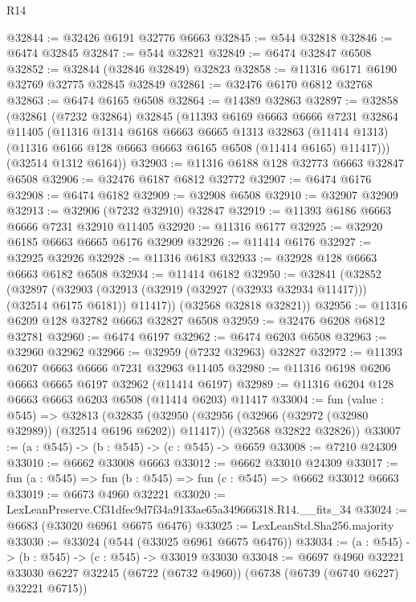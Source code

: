 \begin{lexlean}{R14}
\begin{coremodule}
@32844 := @32426 @6191 @32776 @6663
@32845 := @544 @32818
@32846 := @6474 @32845
@32847 := @544 @32821
@32849 := @6474 @32847 @6508
@32852 := @32844 (@32846 @32849) @32823
@32858 := @11316 @6171 @6190 @32769 @32775 @32845 @32849
@32861 := @32476 @6170 @6812 @32768
@32863 := @6474 @6165 @6508
@32864 := @14389 @32863
@32897 := @32858
    (@32861
      (@7232 @32864)
      @32845
      (@11393
        @6169
        @6663
        @6666
        @7231
        @32864
        @11405
        (@11316
          @1314
          @6168
          @6663
          @6665
          @1313
          @32863
          (@11414 @1313)
          (@11316 @6166 @128 @6663 @6663 @6165 @6508 (@11414 @6165) @11417)))
      (@32514 @1312 @6164))
@32903 := @11316 @6188 @128 @32773 @6663 @32847 @6508
@32906 := @32476 @6187 @6812 @32772
@32907 := @6474 @6176
@32908 := @6474 @6182
@32909 := @32908 @6508
@32910 := @32907 @32909
@32913 := @32906 (@7232 @32910) @32847
@32919 := @11393 @6186 @6663 @6666 @7231 @32910 @11405
@32920 := @11316 @6177
@32925 := @32920 @6185 @6663 @6665 @6176 @32909
@32926 := @11414 @6176
@32927 := @32925 @32926
@32928 := @11316 @6183
@32933 := @32928 @128 @6663 @6663 @6182 @6508
@32934 := @11414 @6182
@32950 := @32841
    (@32852
      (@32897
        (@32903 (@32913 (@32919 (@32927 (@32933 @32934 @11417))) (@32514 @6175 @6181)) @11417))
      (@32568 @32818 @32821))
@32956 := @11316 @6209 @128 @32782 @6663 @32827 @6508
@32959 := @32476 @6208 @6812 @32781
@32960 := @6474 @6197
@32962 := @6474 @6203 @6508
@32963 := @32960 @32962
@32966 := @32959 (@7232 @32963) @32827
@32972 := @11393 @6207 @6663 @6666 @7231 @32963 @11405
@32980 := @11316 @6198 @6206 @6663 @6665 @6197 @32962 (@11414 @6197)
@32989 := @11316 @6204 @128 @6663 @6663 @6203 @6508 (@11414 @6203) @11417
@33004 := fun (value : @545) =>
  @32813
    (@32835
      (@32950 (@32956 (@32966 (@32972 (@32980 @32989)) (@32514 @6196 @6202)) @11417))
      (@32568 @32822 @32826))
@33007 := (a : @545) -> (b : @545) -> (c : @545) -> @6659
@33008 := @7210 @24309
@33010 := @6662 @33008 @6663
@33012 := @6662 @33010 @24309
@33017 := fun (a : @545) => fun (b : @545) => fun (c : @545) => @6662 @33012 @6663
@33019 := @6673 @4960 @32221
@33020 := LexLeanPreserve.Cf31dfec9d7f34a9133ae65a349666318.R14.__fits_34
@33024 := @6683 (@33020 @6961 @6675 @6476)
@33025 := LexLeanStd.Sha256.majority
@33030 := @33024 (@544 (@33025 @6961 @6675 @6476))
@33034 := (a : @545) -> (b : @545) -> (c : @545) -> @33019 @33030
@33048 := @6697
    @4960
    @32221
    @33030
    @6227
    @32245
    (@6722 (@6732 @4960))
    (@6738 (@6739 (@6740 @6227) @32221 @6715))

\end{coremodule}
\end{lexlean}
